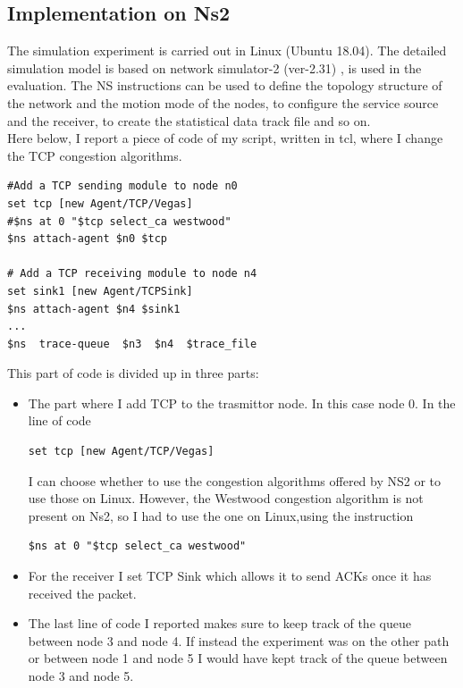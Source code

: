 {{\subsection{Implementation on Ns2}
{The simulation experiment is carried out in Linux (Ubuntu 18.04). The detailed simulation model is based on network simulator-2 (ver-2.31) \cite{hh}, is used in the evaluation. The NS instructions can be used to define the topology structure of the network and the motion mode of the nodes, to configure the service source and the receiver, to create the statistical data track file and so on.\\
Here below, I report a piece of code of my script, written in tcl, where I change the TCP congestion algorithms.\\
\begin{lstlisting}[frame=single,basicstyle=\small]
#Add a TCP sending module to node n0
set tcp [new Agent/TCP/Vegas]
#$ns at 0 "$tcp select_ca westwood"
$ns attach-agent $n0 $tcp

# Add a TCP receiving module to node n4
set sink1 [new Agent/TCPSink]
$ns attach-agent $n4 $sink1
...
$ns  trace-queue  $n3  $n4  $trace_file
\end{lstlisting}
This part of code is divided up in three parts:
\begin{itemize}
\item The part where I add TCP to the trasmittor node. In this case node 0. In the line of code \begin{lstlisting}[frame=single,basicstyle=\small]
set tcp [new Agent/TCP/Vegas]
\end{lstlisting} I can choose whether to use the congestion algorithms offered by NS2 or to use those on Linux. However, the Westwood congestion algorithm is not present on Ns2, so I had to use the one on Linux,using the instruction\begin{lstlisting}[frame=single,basicstyle=\small]
$ns at 0 "$tcp select_ca westwood" \end{lstlisting}

\item For the receiver I set TCP Sink which allows it to send ACKs once it has received the packet.
\item The last line of code I reported makes sure to keep track of the queue between node 3 and node 4. If instead the experiment was on the other path or between node 1 and node 5 I would have kept track of the queue between node 3 and node 5. 
\end{itemize}
}
}}
